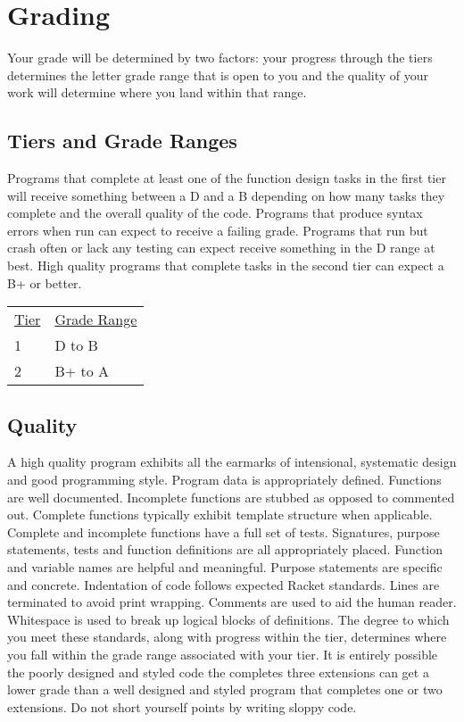 \documentclass[nobib]{tufte-handout}
\begin{document}
\section*{Grading}

Your grade will be determined by two factors: your progress through the tiers determines the letter grade range that is open to you and the quality of your work will determine where you land within that range.

\subsection*{Tiers and Grade Ranges}

Programs that complete at least one of the function design tasks in the first tier will receive something between a D and a B depending on how many tasks they complete and the overall quality of the code. Programs that produce syntax errors when run can expect to receive a failing grade. Programs that run but crash often or lack any testing can expect receive something in the D range at best. High quality programs that complete tasks in the second tier can expect a B+ or better.

\begin{tabular}{ll}
\underline{Tier} & \underline{Grade Range} \\
 1 & D to B \\
 2 & B+ to A
\end{tabular}


\subsection*{Quality}

A high quality program exhibits all the earmarks of intensional, systematic design and good programming style. Program data is appropriately defined. Functions are well documented. Incomplete functions are stubbed as opposed to commented out. Complete functions typically exhibit template structure when applicable. Complete and incomplete functions have a full set of tests. Signatures, purpose statements, tests and function definitions are all appropriately placed.  Function and variable names are helpful and meaningful. Purpose statements are specific and concrete. Indentation of code follows expected Racket standards. Lines are terminated to avoid print wrapping. Comments are used to aid the human reader. Whitespace is used to break up logical blocks of definitions. The degree to which you meet these standards, along with progress within the tier, determines where you fall within the grade range associated with your tier. It is entirely possible the poorly designed and styled code the completes three extensions can get a lower grade than a well designed and styled program that completes one or two extensions. Do not short yourself points by writing sloppy code.
\end{document}

